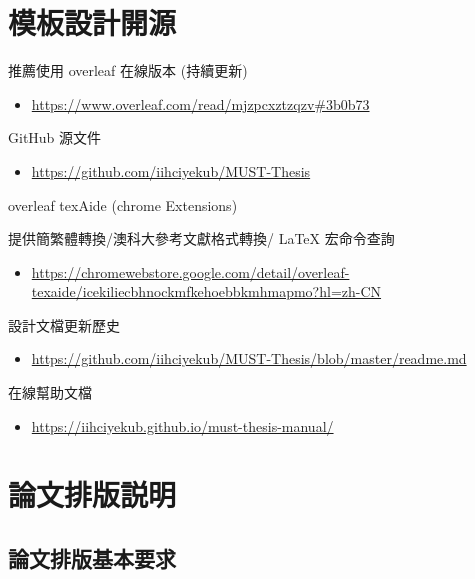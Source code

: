 \documentclass[writingLanguage=chinese,
    addPageTitle=on,
    addDeclaration=on,
    addMUSTlog=off,
    addFigTOC=on,   
    addTabTOC=on,
    refIndent=off,
    printMod=off,
]{.def/must}
\begin{document}
\addtableofcontents

\chapter{模板設計開源}
\noindent \faHandORight\; 推薦使用 overleaf 在線版本 (持續更新) 
\begin{itemize}
    \item \url{https://www.overleaf.com/read/mjzpcxztzqzv#3b0b73}
\end{itemize}

\noindent \faHandORight\;  GitHub 源文件 
\begin{itemize}
    \item \url{https://github.com/iihciyekub/MUST-Thesis}
\end{itemize}

\noindent \faHandORight\; overleaf texAide (chrome Extensions) 

提供簡繁體轉換/澳科大參考文獻格式轉換/ \LaTeX{} 宏命令查詢 
\begin{itemize}
    \item \url{https://chromewebstore.google.com/detail/overleaf-texaide/icekiliecbhnockmfkehoebbkmhmapmo?hl=zh-CN}
\end{itemize}

\noindent \faHandORight\; 設計文檔更新歷史 
\begin{itemize}
    \item \url{https://github.com/iihciyekub/MUST-Thesis/blob/master/readme.md}
\end{itemize}

\noindent \faHandORight\; 在線幫助文檔 
\begin{itemize}
    \item \url{https://iihciyekub.github.io/must-thesis-manual/}
\end{itemize}





\chapter{論文排版説明}
\section{論文排版基本要求}
\end{document}
